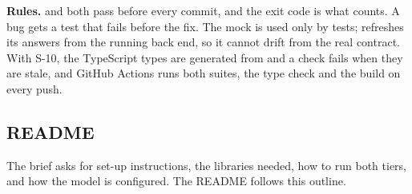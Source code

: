 \textbf{Rules.}  and  both pass before every commit, and
the exit code is what counts. A bug gets a test that fails before the fix. The mock is used only by
tests;  refreshes its answers from the running back end, so it cannot drift
from the real contract. With S-10, the TypeScript types are generated from  and a
check fails when they are stale, and GitHub Actions runs both suites, the type check and the build
on every push.

\subsection{README}
\label{sec:readme}

The brief asks for set-up instructions, the libraries needed, how to run both tiers, and how the
model is configured. The README follows this outline.

